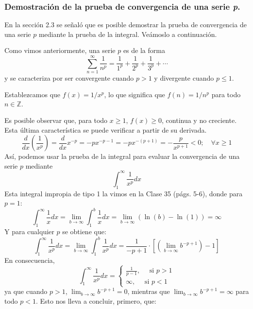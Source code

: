\documentclass[12pt]{article}
\begin{document}
\subsubsection{Demostración de la prueba de convergencia de una serie \textit{p}.}

En la sección 2.3 se señaló que es posible demostrar la prueba de convergencia de una serie $p$ mediante la prueba de la integral. Veámoslo a continuación.

Como vimos anteriormente, una serie $p$ es de la forma
\[
  \sum_{n = 1}^{\infty} \frac{1}{n^{p}} = \frac{1}{1^{p}} + \frac{1}{2^{p}} + \frac{1}{3^{p}} + \cdots
\]
y se caracteriza por ser convergente cuando $p > 1$ y divergente cuando $p \leq 1$.

Establezcamos que $f(x) = 1/x^{p}$, lo que significa que $f(n) = 1/n^{p}$ para todo $n \in \mathbb{Z}$.

Es posible observar que, para todo $x \geq 1$, $f(x) \geq 0$, continua y no creciente. Esta última característica se puede verificar a partir de su derivada.
\[
  \frac{d}{dx} \left(\frac{1}{x^{p}}\right) = \frac{d}{dx} x^{-p}
                                            = -px^{-p - 1}
                                            = -px^{-(p + 1)} 
                                            = - \frac{p}{x^{p + 1}} < 0; \quad \forall x \geq 1
\]
Así, podemos usar la prueba de la integral para evaluar la convergencia de una serie $p$ mediante
\[
  \int_{1}^{\infty} \frac{1}{x^{p}} dx
\]
Esta integral impropia de tipo 1 la vimos en la Clase 35 (págs. 5-6), donde para $p = 1$:
\[
  \int_{1}^{\infty} \frac{1}{x} dx = \lim_{b \to \infty} \int_{1}^{b} \frac{1}{x} dx
                                       = \lim_{b \to \infty} (\ln(b) - \ln(1))
                                       = \infty
\]
Y para cualquier $p$ se obtiene que:
\[
  \int_{1}^{\infty} \frac{1}{x^{p}} dx = \lim_{b \to \infty} \int_{1}^{b} \frac{1}{x^{p}} dx
                                       = \frac{1}{-p + 1} \cdot \left[\left(\lim_{b \to \infty} b^{-p + 1}\right) - 1 \right]
\]
En consecuencia,
\[
  \int_{1}^{\infty} \frac{1}{x^{p}} dx =
  \left\{
    \begin{aligned}
    \frac{1}{p - 1}, \quad \text{ si } p > 1 \\
    \infty, \quad \text{ si } p < 1
    \end{aligned}
  \right.
\]
ya que cuando $p > 1$, $\lim_{b \to \infty} b^{-p + 1} = 0$, mientras que $\lim_{b \to \infty} b^{-p + 1} = \infty$ para todo $p < 1$. Esto nos lleva a concluir, primero, que:
\end{document}
